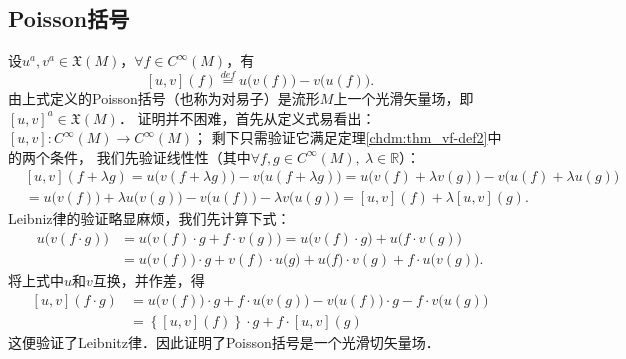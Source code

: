 \subsection{Poisson括号}\label{chdm:sec_poisson-lie}
设$u^a,v^a \in \mathfrak{X}(M)$，$\forall f\in C^\infty(M)$，有
\begin{equation}\label{chdm:def_poisson-bracket}
    \left[u,v\right] (f) \overset{def}{=} u\bigl(v(f)\bigr) - v\bigl(u(f)\bigr) .
\end{equation}
由上式定义的Poisson括号（也称为对易子）是流形$M$上一个光滑矢量场，即$[u,v]^a \in \mathfrak{X}(M)$．
证明并不困难，首先从定义式易看出：$\left[u,v\right]:C^\infty(M)\to C^\infty(M)$；
剩下只需验证它满足定理\ref{chdm:thm_vf-def2}中的两个条件，
我们先验证线性性（其中$\forall f,g \in C^\infty(M),\ \lambda \in \mathbb{R} $）：
\setlength{\mathindent}{0em}
\begin{align*}
    &\left[u,v\right] (f + \lambda g) = u\bigl(v(f + \lambda g)\bigr) - v\bigl(u(f + \lambda g)\bigr) 
    =u\bigl(v(f)+\lambda v(g)\bigr)- v\bigl(u(f)+\lambda u(g)\bigr) \\
    &=u\bigl(v(f)\bigr)+ \lambda u\bigl(v(g)\bigr) - v\bigl(u(f)\bigr) - \lambda v\bigl( u(g)\bigr) 
    =\left[u,v\right] (f ) + \lambda \left[u,v\right] ( g) .
\end{align*}\setlength{\mathindent}{2em}
Leibniz律的验证略显麻烦，我们先计算下式：
\begin{align*}
    u\bigl(v(f \cdot g)\bigr) &= u\bigl( v(f) \cdot g+ f \cdot v( g)\bigr)    
      = u\bigl( v(f) \cdot g\bigr) + u\bigl( f \cdot v( g)\bigr) \\
      &= u\bigl( v(f) \bigr) \cdot g + v(f) \cdot u\bigl(  g\bigr) 
      + u\bigl( f \bigr) \cdot v(g) + f \cdot u\bigl( v( g)\bigr) .
\end{align*}
将上式中$u$和$v$互换，并作差，得
\begin{align*}
    \left[u,v\right] (f \cdot g) &= u\bigl( v(f) \bigr) \cdot g + f \cdot u\bigl( v( g)\bigr)
      -v\bigl( u(f) \bigr) \cdot g - f \cdot v\bigl( u( g)\bigr) \\
      & =\left\{ \left[u,v\right](f) \right\} \cdot g + f \cdot \left[u,v\right]  (g)
\end{align*}
这便验证了Leibnitz律．因此证明了Poisson括号是一个光滑切矢量场．

